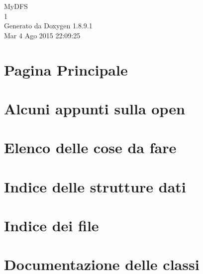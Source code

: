 \documentclass[twoside]{book}
\newcommand{\+}{\discretionary{\mbox{\scriptsize$\hookleftarrow$}}{}{}}
\newcommand{\clearemptydoublepage}{%
  \newpage{\pagestyle{empty}\cleardoublepage}%
}
\begin{document}
\hypersetup{pageanchor=false,
             bookmarks=true,
             bookmarksnumbered=true,
             pdfencoding=unicode
            }
\begin{titlepage}
\vspace*{7cm}
\begin{center}%
{\Large My\+D\+F\+S \\[1ex]\large 1 }\\
\vspace*{1cm}
{\large Generato da Doxygen 1.8.9.1}\\
\vspace*{0.5cm}
{\small Mar 4 Ago 2015 22:09:25}\\
\end{center}
\end{titlepage}
\clearemptydoublepage
\tableofcontents
\clearemptydoublepage
{}
\hypersetup{pageanchor=true}

\chapter{Pagina Principale}
\label{index}\hypertarget{index}{}
\chapter{Alcuni appunti sulla open}
\label{md_OPE}
\hypertarget{md_OPE}{}

\chapter{Elenco delle cose da fare}
\label{todo}
\hypertarget{todo}{}

\chapter{Indice delle strutture dati}

\chapter{Indice dei file}

\chapter{Documentazione delle classi}







\end{document}
